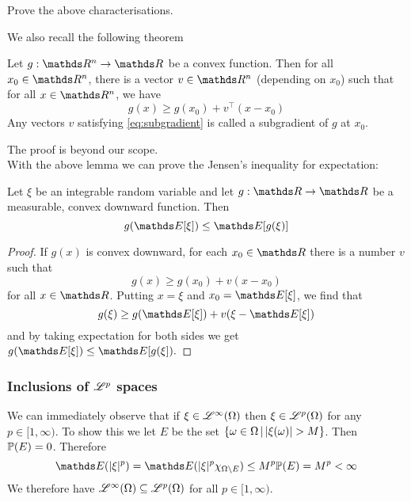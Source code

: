 \begin{exercise}
Prove the above characterisations.
\end{exercise}

We also recall the following theorem
\begin{proposition}
Let $g: \R^n \to \R$ be a convex function. Then for all $x_0 \in \R^n$, there is a vector $v \in \R^n$ (depending on $x_0$) such that for all $x \in \R^n$, we have
\begin{equation} \label{eq:subgradient}
    g(x) \geq g(x_0) + v^\top (x - x_0)
\end{equation}
Any vectors $v$ satisfying \eqref{eq:subgradient} is called a subgradient of $g$ at $x_0$.
\end{proposition}

The proof is beyond our scope. \\

With the above lemma we can prove the Jensen's inequality for expectation:
\begin{theorem}
Let $\xi$ be an integrable random variable and let $g:\R \to \R$ be a measurable, convex downward function. Then
\begin{equation}
    g(\E [\xi]) \leq \E [g(\xi)]
\end{equation}
\end{theorem}
\begin{proof}
If $g(x)$ is convex downward, for each $x_0 \in \R$ there is a number $v$ such that
\begin{equation}
    g(x) \ge g(x_0) + v(x - x_0)
\end{equation}
for all $x \in \R$. Putting $x = \xi$ and $x_0 = \E [\xi]$, we find that
\begin{equation}
    g(\xi) \ge g(\E[\xi]) + v(\xi - \E [\xi])
\end{equation}
and by taking expectation for both sides we get  $g(\E [\xi]) \le \E [g(\xi]).$
\end{proof}

\subsubsection{Inclusions of $\mathcal{L}^p$ spaces}
We can immediately observe that if $\xi \in \mathcal{L}^\infty(\Omega)$ then $\xi \in \mathcal{L}^p(\Omega)$ for any $p \in [1,\infty)$. To show this we let $E$ be the set $\left\{ \omega \in \Omega \,|\, |\xi(\omega)| > M  \right \}$. Then $\mathbb{P}(E) = 0$. Therefore 
\begin{equation} \label{eq:Holder_infty}
    \E(|\xi|^p) = \E(|\xi|^p \chi_{\Omega \setminus E}) \leq M^p \p(E) = M^p < \infty
\end{equation}
We therefore have $\mathcal{L}^\infty(\Omega) \subseteq \mathcal{L}^p(\Omega)$ for all $p \in [1,\infty)$.\\

